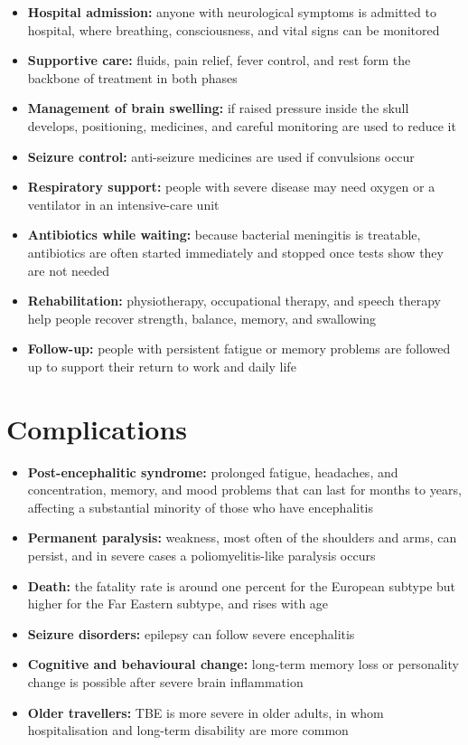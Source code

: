 \begin{itemize}
    \item \textbf{Hospital admission:} anyone with neurological symptoms is admitted to hospital, where breathing, consciousness, and vital signs can be monitored
    \item \textbf{Supportive care:} fluids, pain relief, fever control, and rest form the backbone of treatment in both phases
    \item \textbf{Management of brain swelling:} if raised pressure inside the skull develops, positioning, medicines, and careful monitoring are used to reduce it
    \item \textbf{Seizure control:} anti-seizure medicines are used if convulsions occur
    \item \textbf{Respiratory support:} people with severe disease may need oxygen or a ventilator in an intensive-care unit
    \item \textbf{Antibiotics while waiting:} because bacterial meningitis is treatable, antibiotics are often started immediately and stopped once tests show they are not needed
    \item \textbf{Rehabilitation:} physiotherapy, occupational therapy, and speech therapy help people recover strength, balance, memory, and swallowing
    \item \textbf{Follow-up:} people with persistent fatigue or memory problems are followed up to support their return to work and daily life
\end{itemize}

\section*{Complications}
\begin{itemize}
    \item \textbf{Post-encephalitic syndrome:} prolonged fatigue, headaches, and concentration, memory, and mood problems that can last for months to years, affecting a substantial minority of those who have encephalitis
    \item \textbf{Permanent paralysis:} weakness, most often of the shoulders and arms, can persist, and in severe cases a poliomyelitis-like paralysis occurs
    \item \textbf{Death:} the fatality rate is around one percent for the European subtype but higher for the Far Eastern subtype, and rises with age
    \item \textbf{Seizure disorders:} epilepsy can follow severe encephalitis
    \item \textbf{Cognitive and behavioural change:} long-term memory loss or personality change is possible after severe brain inflammation
    \item \textbf{Older travellers:} TBE is more severe in older adults, in whom hospitalisation and long-term disability are more common
\end{itemize}

